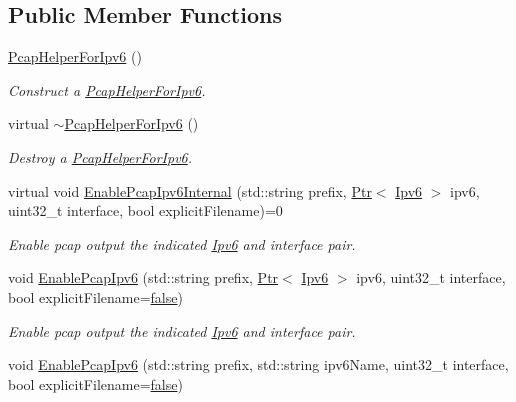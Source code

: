 \subsection*{Public Member Functions}
\begin{DoxyCompactItemize}
\item 
\hyperlink{classns3_1_1PcapHelperForIpv6_a8c16335d69d5be19f296c73b66261b33}{Pcap\+Helper\+For\+Ipv6} ()
\begin{DoxyCompactList}\small\item\em Construct a \hyperlink{classns3_1_1PcapHelperForIpv6}{Pcap\+Helper\+For\+Ipv6}. \end{DoxyCompactList}\item 
virtual \hyperlink{classns3_1_1PcapHelperForIpv6_a8e8511b2ec2b3026ac4bad0ccc258443}{$\sim$\+Pcap\+Helper\+For\+Ipv6} ()
\begin{DoxyCompactList}\small\item\em Destroy a \hyperlink{classns3_1_1PcapHelperForIpv6}{Pcap\+Helper\+For\+Ipv6}. \end{DoxyCompactList}\item 
virtual void \hyperlink{classns3_1_1PcapHelperForIpv6_afdb171c84a6ffb3dc21010efbcd7957c}{Enable\+Pcap\+Ipv6\+Internal} (std\+::string prefix, \hyperlink{classns3_1_1Ptr}{Ptr}$<$ \hyperlink{classns3_1_1Ipv6}{Ipv6} $>$ ipv6, uint32\+\_\+t interface, bool explicit\+Filename)=0
\begin{DoxyCompactList}\small\item\em Enable pcap output the indicated \hyperlink{classns3_1_1Ipv6}{Ipv6} and interface pair. \end{DoxyCompactList}\item 
void \hyperlink{classns3_1_1PcapHelperForIpv6_ad03349f9f36a0159baeed4ed6adcd079}{Enable\+Pcap\+Ipv6} (std\+::string prefix, \hyperlink{classns3_1_1Ptr}{Ptr}$<$ \hyperlink{classns3_1_1Ipv6}{Ipv6} $>$ ipv6, uint32\+\_\+t interface, bool explicit\+Filename=\hyperlink{lte__cqi__generation_8m_ab1bef239d413c4da139c4bac92cd657a}{false})
\begin{DoxyCompactList}\small\item\em Enable pcap output the indicated \hyperlink{classns3_1_1Ipv6}{Ipv6} and interface pair. \end{DoxyCompactList}\item 
void \hyperlink{classns3_1_1PcapHelperForIpv6_ae15cc0a2bb5e6204f684d8ce77361389}{Enable\+Pcap\+Ipv6} (std\+::string prefix, std\+::string ipv6\+Name, uint32\+\_\+t interface, bool explicit\+Filename=\hyperlink{lte__cqi__generation_8m_ab1bef239d413c4da139c4bac92cd657a}{false})

\end{DoxyCompactItemize}
